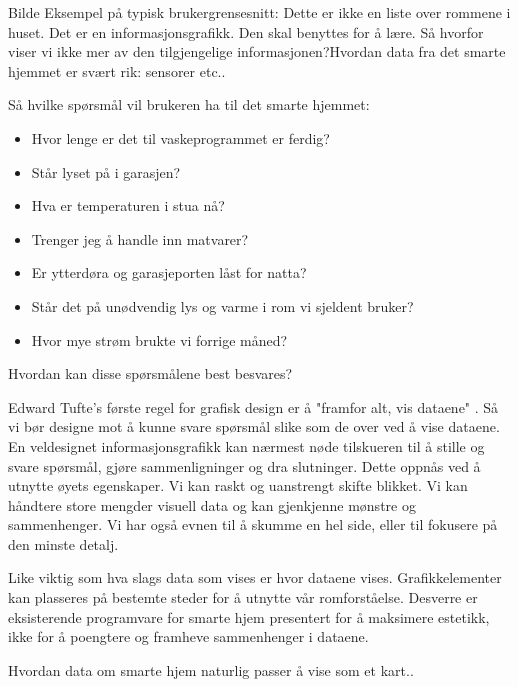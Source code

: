 {\color{red}Bilde Eksempel på typisk brukergrensesnitt:}
Dette er ikke en liste over rommene i huset. Det er en informasjonsgrafikk. Den skal benyttes for å lære. Så hvorfor viser vi ikke mer av den tilgjengelige informasjonen?{\color{red}Hvordan data fra det smarte hjemmet er svært rik: sensorer etc..}

Så hvilke spørsmål vil brukeren ha til det smarte hjemmet:
\begin{itemize}
\item Hvor lenge er det til vaskeprogrammet er ferdig?
\item Står lyset på i garasjen?
\item Hva er temperaturen i stua nå?
\item Trenger jeg å handle inn matvarer?
\item Er ytterdøra og garasjeporten låst for natta?
\item Står det på unødvendig lys og varme i rom vi sjeldent bruker?
\item Hvor mye strøm brukte vi forrige måned?
\end{itemize}
Hvordan kan disse spørsmålene best besvares? 

Edward Tufte's første regel for grafisk design er å "framfor alt, vis dataene" \citet{tufte01}. Så vi bør designe mot å kunne svare spørsmål slike som de over ved å vise dataene. En veldesignet informasjonsgrafikk kan nærmest nøde tilskueren til å stille og svare spørsmål, gjøre sammenligninger og dra slutninger. Dette oppnås ved å utnytte øyets egenskaper. Vi kan raskt og uanstrengt skifte blikket. Vi kan håndtere store mengder visuell data og kan gjenkjenne mønstre og sammenhenger. Vi har også evnen til å skumme en hel side, eller til fokusere på den minste detalj.

Like viktig som hva slags data som vises er hvor dataene vises. Grafikkelementer kan plasseres på bestemte steder for å utnytte vår romforståelse. Desverre er eksisterende programvare for smarte hjem presentert for å maksimere estetikk, ikke for å poengtere og framheve sammenhenger i dataene.

{\color{red}Hvordan data om smarte hjem naturlig passer å vise som et kart..}

